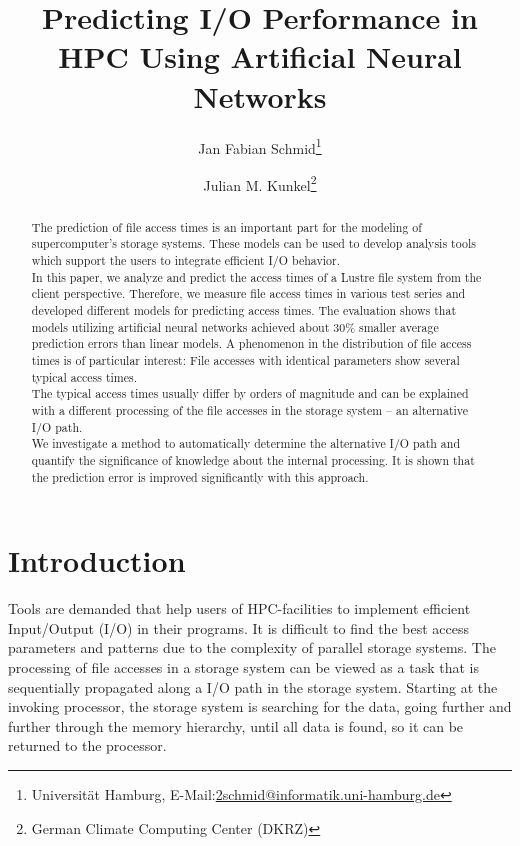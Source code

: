 \documentclass{superfri}
\begin{document}
	
	\author{Jan Fabian Schmid\footnote{\label{susu}Universität Hamburg, E-Mail:\url{2schmid@informatik.uni-hamburg.de}} \and Julian M. Kunkel\footnote{German Climate Computing Center (DKRZ)}}
	
	\title{Predicting I/O Performance in HPC Using Artificial Neural Networks}
	
	\maketitle{}
	
	\begin{abstract}
		
		The prediction of file access times is an important part for the modeling of supercomputer's storage systems. 
		These models can be used to develop analysis tools which support the users to integrate efficient I/O behavior.\\
		In this paper, we analyze and predict the access times of a Lustre file system from the client perspective.
		Therefore, we measure file access times in various test series and developed different models for predicting access times. 
		The evaluation shows that models utilizing artificial neural networks achieved about 30\% smaller average prediction errors than linear models. 
		A phenomenon in the distribution of file access times is of particular interest:
		File accesses with identical parameters show several typical access times.\\
		The typical access times usually differ by orders of magnitude and can be explained with a different processing of the file accesses in the storage system -- an alternative I/O path.\\
		We investigate a method to automatically determine the alternative I/O path and quantify the significance of knowledge about the internal processing.
		It is shown that the prediction error is improved significantly with this approach.
		
	\end{abstract}
	
	\section*{Introduction}
	\label{sec:intro}
	
	Tools are demanded that help users of HPC-facilities to implement efficient Input/Output (I/O) in their programs.
	It is difficult to find the best access parameters and patterns due to the complexity of parallel storage systems.
	The processing of file accesses in a storage system can be viewed as a task that is sequentially propagated along a I/O path in the storage system.
	Starting at the invoking processor, the storage system is searching for the data, going further and further through the memory hierarchy, until all data is found, so it can be returned to the processor.
	
\end{document}
